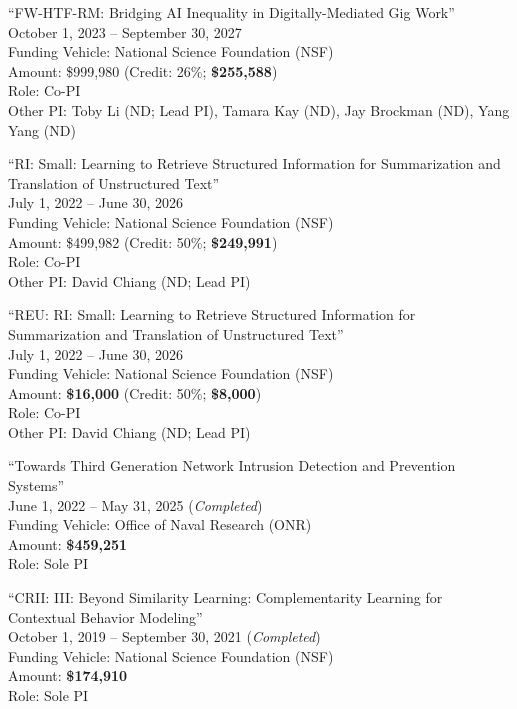 \documentclass[10pt]{article}
\newenvironment{myindentpar}[1]%
{\begin{list}{}%
         {\setlength{\leftmargin}{#1}}%
         \item[]%
}
{\end{list}}
\newcounter{list}
\begin{document}
\begin{myindentpar}{0.75cm}
\hspace{-0.75cm}``FW-HTF-RM: Bridging AI Inequality in Digitally-Mediated Gig Work'' \\
October 1, 2023 -- September 30, 2027 \\
Funding Vehicle: National Science Foundation (NSF) \\
Amount: \$999,980 (Credit: 26\%; \textbf{\$255,588}) \\
Role: {Co-PI} \\
Other PI: Toby Li (ND; Lead PI), Tamara Kay (ND), Jay Brockman (ND), Yang Yang (ND)

\hspace{-0.75cm}``RI: Small: Learning to Retrieve Structured Information for Summarization and Translation of Unstructured Text'' \\
July 1, 2022 -- June 30, 2026 \\
Funding Vehicle: National Science Foundation (NSF) \\
Amount: \$499,982 (Credit: 50\%; \textbf{\$249,991}) \\
Role: {Co-PI} \\
Other PI: David Chiang (ND; Lead PI)

\hspace{-0.75cm}``REU: RI: Small: Learning to Retrieve Structured Information for Summarization and Translation of Unstructured Text'' \\
July 1, 2022 -- June 30, 2026 \\
Funding Vehicle: National Science Foundation (NSF) \\
Amount: \textbf{\$16,000} (Credit: 50\%; \textbf{\$8,000}) \\
Role: {Co-PI} \\
Other PI: David Chiang (ND; Lead PI)

\hspace{-0.75cm}``Towards Third Generation Network Intrusion Detection and Prevention Systems'' \\
June 1, 2022 -- May 31, 2025 (\emph{Completed}) \\
Funding Vehicle: Office of Naval Research (ONR) \\
Amount: \textbf{\$459,251} \\
Role: {Sole PI}

\hspace{-0.75cm}``CRII: III: Beyond Similarity Learning: Complementarity Learning for Contextual Behavior Modeling'' \\
October 1, 2019 -- September 30, 2021 (\emph{Completed}) \\
Funding Vehicle: National Science Foundation (NSF) \\
Amount: \textbf{\$174,910} \\
Role: {Sole PI}


\end{myindentpar}
\end{document}
